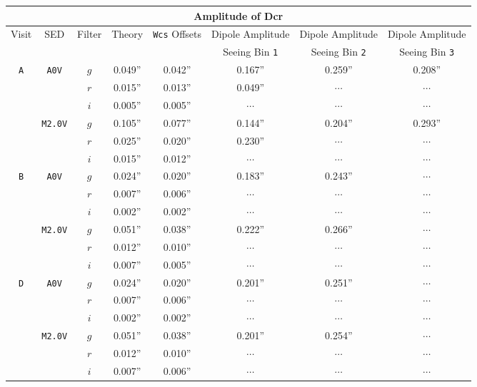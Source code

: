 \documentclass[prd, nofootinbib, floatfix, 11pt, tightenlines, times]{article}
\def\A{{\tt A}}
\def\B{{\tt B}}
\def\D{{\tt D}}
\begin{document}
\begin{table}
\centering
\begin{tabular}{cccccccc}
\hline
\multicolumn{8}{|c|}{Amplitude of Dcr} \\
\hline
Visit    & SED & Filter & Theory & {\tt Wcs} Offsets & Dipole Amplitude   & Dipole Amplitude   & Dipole Amplitude \\
         &     &        &        &                   & Seeing Bin {\tt 1} & Seeing Bin {\tt 2} & Seeing Bin {\tt 3} \\
\hline
\A & {\tt A0V}   & $g$ & 0.049'' & 0.042'' & 0.167''  & 0.259''  & 0.208''  \\
   &             & $r$ & 0.015'' & 0.013'' & 0.049''  & $\cdots$ & $\cdots$ \\
   &             & $i$ & 0.005'' & 0.005'' & $\cdots$ & $\cdots$ & $\cdots$ \\
   & {\tt M2.0V} & $g$ & 0.105'' & 0.077'' & 0.144''  & 0.204''  & 0.293''  \\
   &             & $r$ & 0.025'' & 0.020'' & 0.230''  & $\cdots$ & $\cdots$ \\
   &             & $i$ & 0.015'' & 0.012'' & $\cdots$ & $\cdots$ & $\cdots$ \\
\hline
\B & {\tt A0V}   & $g$ & 0.024'' & 0.020'' & 0.183''  & 0.243''  & $\cdots$ \\
   &             & $r$ & 0.007'' & 0.006'' & $\cdots$ & $\cdots$ & $\cdots$ \\
   &             & $i$ & 0.002'' & 0.002'' & $\cdots$ & $\cdots$ & $\cdots$ \\
   & {\tt M2.0V} & $g$ & 0.051'' & 0.038'' & 0.222''  & 0.266''  & $\cdots$ \\
   &             & $r$ & 0.012'' & 0.010'' & $\cdots$ & $\cdots$ & $\cdots$ \\
   &             & $i$ & 0.007'' & 0.005'' & $\cdots$ & $\cdots$ & $\cdots$ \\
\hline
\D & {\tt A0V}   & $g$ & 0.024'' & 0.020'' & 0.201''  & 0.251''  & $\cdots$ \\
   &             & $r$ & 0.007'' & 0.006'' & $\cdots$ & $\cdots$ & $\cdots$ \\
   &             & $i$ & 0.002'' & 0.002'' & $\cdots$ & $\cdots$ & $\cdots$ \\
   & {\tt M2.0V} & $g$ & 0.051'' & 0.038'' & 0.201''  & 0.254''  & $\cdots$ \\
   &             & $r$ & 0.012'' & 0.010'' & $\cdots$ & $\cdots$ & $\cdots$ \\ 
   &             & $i$ & 0.007'' & 0.006'' & $\cdots$ & $\cdots$ & $\cdots$ \\

\end{tabular}
\end{table}
\end{document}
